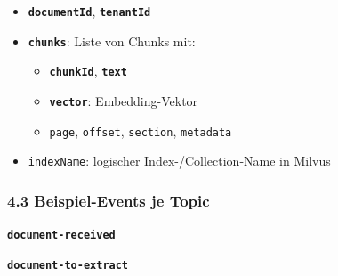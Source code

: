 \begin{itemize}
  \begin{itemize}
  \tightlist
  \item
    \textbf{\texttt{documentId}}, \textbf{\texttt{tenantId}}
  \item
    \textbf{\texttt{chunks}}: Liste von Chunks mit:

    \begin{itemize}
    \tightlist
    \item
      \textbf{\texttt{chunkId}}, \textbf{\texttt{text}}
    \item
      \textbf{\texttt{vector}}: Embedding-Vektor
    \item
      \texttt{page}, \texttt{offset}, \texttt{section},
      \texttt{metadata}
    \end{itemize}
  \item
    \texttt{indexName}: logischer Index-/Collection-Name in Milvus
  \end{itemize}
\end{itemize}

\subsubsection{4.3 Beispiel-Events je
Topic}\label{beispiel-events-je-topic}

\textbf{\texttt{document-received}}

\begin{Shaded}
\begin{Highlighting}[]
\FunctionTok{\{}
  \FunctionTok{:} \FunctionTok{,}
  \FunctionTok{:} \FunctionTok{,}
  \FunctionTok{:} \FunctionTok{,}
  \FunctionTok{:} \FunctionTok{,}
  \FunctionTok{:} \FunctionTok{,}
  \FunctionTok{:} \FunctionTok{,}
  \FunctionTok{:} \FunctionTok{,}
  \FunctionTok{:} 
\FunctionTok{\}}
\end{Highlighting}
\end{Shaded}

\textbf{\texttt{document-to-extract}}

\begin{Shaded}
\begin{Highlighting}[]
\FunctionTok{\{}
  \FunctionTok{:} \FunctionTok{,}
  \FunctionTok{:} \FunctionTok{,}
  \FunctionTok{:} \FunctionTok{,}
  \FunctionTok{:} 
\FunctionTok{\}}
\end{Highlighting}
\end{Shaded}

